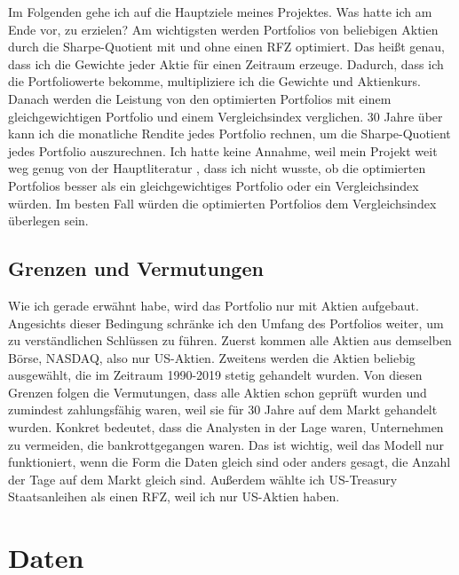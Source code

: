 \documentclass[12pt]{article}
\begin{document}
            Im Folgenden gehe ich auf die Hauptziele meines Projektes. 
            Was hatte ich am Ende vor, zu erzielen? 
            Am wichtigsten werden Portfolios von beliebigen Aktien durch die Sharpe-Quotient mit und
            ohne einen RFZ optimiert. Das heißt genau, dass ich die Gewichte jeder Aktie für einen Zeitraum erzeuge. 
            Dadurch, dass ich die Portfoliowerte bekomme, multipliziere ich die Gewichte und Aktienkurs. 
            Danach werden die Leistung von den optimierten Portfolios mit einem gleichgewichtigen Portfolio und 
            einem Vergleichsindex verglichen. 30 Jahre über kann ich die monatliche Rendite jedes Portfolio rechnen, 
            um die Sharpe-Quotient jedes Portfolio auszurechnen. 
            Ich hatte keine Annahme, weil mein Projekt weit weg genug von der Hauptliteratur \cite{zhang2020}, 
            dass ich nicht wusste, ob die optimierten Portfolios besser als ein gleichgewichtiges Portfolio oder 
            ein Vergleichsindex würden. Im besten Fall würden die optimierten Portfolios dem Vergleichsindex überlegen sein.

        \subsection{Grenzen und Vermutungen}
    
            Wie ich gerade erwähnt habe, wird das Portfolio nur mit Aktien aufgebaut. 
            Angesichts dieser Bedingung schränke ich den Umfang des Portfolios weiter, 
            um zu verständlichen Schlüssen zu führen. Zuerst kommen alle Aktien aus demselben Börse, NASDAQ, also nur US-Aktien. 
            Zweitens werden die Aktien beliebig ausgewählt, die im Zeitraum 1990-2019 stetig gehandelt wurden. 
            Von diesen Grenzen folgen die Vermutungen, dass alle Aktien schon geprüft wurden und zumindest zahlungsfähig waren,
            weil sie für 30 Jahre auf dem Markt gehandelt wurden. 
            Konkret bedeutet, dass die Analysten in der Lage waren, Unternehmen zu vermeiden, die bankrottgegangen waren. 
            Das ist wichtig, weil das Modell nur funktioniert, wenn die Form die Daten gleich sind oder anders gesagt, 
            die Anzahl der Tage auf dem Markt gleich sind. Außerdem wählte ich US-Treasury Staatsanleihen als einen RFZ, 
            weil ich nur US-Aktien haben.
        
    \newpage \section{Daten}
            
\end{document}
